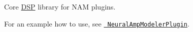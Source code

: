 Core \mbox{\hyperlink{class_d_s_p}{D\+SP}} library for N\+AM plugins.

For an example how to use, see \href{https://github.com/sdatkinson/NeuralAmpModelerPlugin}{\texttt{ Neural\+Amp\+Modeler\+Plugin}}. 
